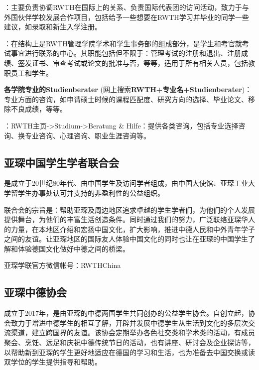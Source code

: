     \href{https://www.rwth-aachen.de/go/id/pvd/lidx/1}{}：主要负责协调RWTH在国际上的关系、负责国际代表团的访问活动，致力于与外国伙伴学校发展合作项目，包括给予一些想要在RWTH学习并毕业的同学一些建议，如录取和新生入学注册。

    \href{https://www.rwth-aachen.de/cms/root/Die-RWTH/Einrichtungen/Verwaltung/Dezernate/Akademische-und-studentische-Angelegenhe/~rcv/Abteilung-1-3-Zentrales-Pruefungsamt/}{}：在结构上是RWTH管理学院学术和学生事务部的组成部分，是学生和考官就考试事宜进行联系的中心。其职能包括但不限于：管理考试的注册和退出、注册成绩、签发证书、审查考试或论文的批准与否，等等，适用于所有相关人员，包括教职员工和学生。

    \textbf{各学院专业的Studienberater} (网上搜索\textbf{RWTH+专业名+Studienberater})：专业方面的咨询，如申请硕士时候的课程匹配度、研究方向的选择、毕业论文、移除不良成绩，等等。

    ：RWTH主页->Studium->Beratung \& Hilfe：提供各类咨询，包括专业选择咨询、换专业咨询、心理咨询、职业生涯咨询等。

  \subsection{亚琛中国学生学者联合会}\label{subsec:亚琛中国学生学者联合会}

    \href{http://www.vcwsa.rwth-aachen.de/}{}是成立于20世纪80年代、由中国学生及访问学者组成，由中国大使馆、亚琛工业大学留学生办事处认可并支持的非盈利性的公益组织。

    联合会的宗旨是：帮助亚琛及周边地区追求卓越的学生学者们，为他们的个人发展提供舞台，为他们的丰富生活创造条件。同时通过我们的努力，广泛联络亚琛华人的力量，在本地区介绍和宏扬中国文化，扩大影响，推进中德人民和中外青年学子之间的友谊。让亚琛地区的国际友人体验中国文化的同时也让在亚琛的中国学生了解和体验德国文化做好中德之间的桥梁。

    亚琛学联官方微信帐号：RWTHChina

  \subsection{亚琛中德协会}\label{subsec:亚琛中德协会}

    \href{https://www.cg-society.com/en/}{}成立于2017年，是由亚琛的中德两国学生共同创办的公益学生协会。自创立起，协会致力于增进中德学生的相互了解，开辟并发展中德学生从生活到文化的多层次交流渠道，建立跨国界的友谊。该协会定期举办各色社交类和学术类的活动，有成员聚会、烹饪、远足和庆祝中德传统节日的活动，也有讲座、研讨会及企业探访等，以帮助新到亚琛的学生更好地适应在德国的学习和生活，也为准备去中国交换或读双学位的学生提供指导和帮助。

